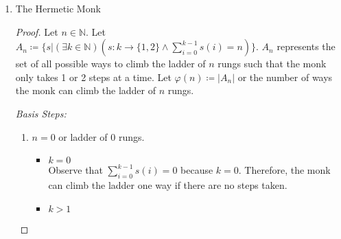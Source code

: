 \documentclass{article}
\newcommand{\defeq}{\coloneqq}
\newcommand{\naturals}{\mathbb{N}}
\newenvironment{case}[1][Case]
    {\par\textit{#1:}\hfill\break}
    {}
\begin{document}
\begin{enumerate}
\begin{proof}
\begin{case}[$n>0$]
            \textcolor{blue}{
            The following examples are just for understanding.
            }
            \begin{enumerate}
                \item let $n=4$ and $s=$`111'. This represents 1+1+1+1
                \item let $n=4$ and $s=$`011'. This represents 2+1+1
                \item let $n=4$ and $s=$`101'. This represents 1+2+1
                \item let $n=4$ and $s=$`110'. This represents 1+1+2
                \item let $n=4$ and $s=$`100'. This represents 1+3
                \item let $n=4$ and $s=$`010'. This represents 2+2
                \item let $n=4$ and $s=$`001'. This represents 3+1
                \item let $n=4$ and $s=$`000'. This represents 4
            \end{enumerate}
        \end{case}
        We know that there are $|\{0,1\}|^{|n-1|}=2^{n-1}$ distinct strings (functions) by theorem 6.10 so there are $2^{n-1}$ distinct ways to write $n$ as a sum of positive integers.
    \end{proof}
\pagebreak 
    \item The Hermetic Monk
    \begin{proof}
    Let $n \in \naturals$. Let $A_n \defeq \{s|(\exists k \in \naturals)(s:k \to \{1,2\} \land \sum_{i=0}^{k-1}s(i)=n)\}$. $A_n$ represents the set of all possible ways to climb the ladder of $n$ rungs such that the monk only takes 1 or 2 steps at a time. Let $\varphi(n) \defeq |A_n|$ or the number of ways the monk can climb the ladder of $n$ rungs.
    \begin{case}[Basis Steps]
    \vspace{-0.7cm}
        \begin{enumerate}
            \item []$n=0$ or ladder of 0 rungs.
                \begin{itemize}
                    \item $k=0$\\
                        Observe that $\sum_{i=0}^{k-1}s(i)=0$ because $k=0$. Therefore, the monk can climb the ladder one way if there are no steps taken.
                    \item $k>1$\\

\end{itemize}
\end{enumerate}
\end{case}
\end{proof}
\end{enumerate}
\end{document}
